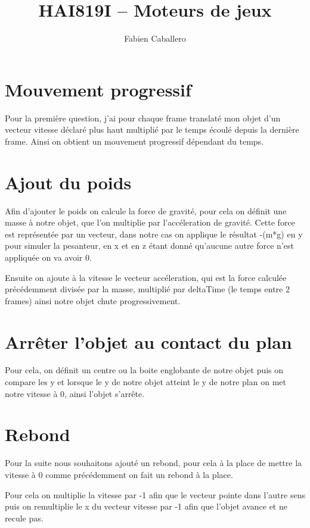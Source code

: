 \documentclass{article}
\title{HAI819I – Moteurs de jeux
}
\author{Fabien Caballero}
\begin{document}
\maketitle
    \tableofcontents

\newpage
\section{Mouvement progressif}

Pour la première question, j'ai pour chaque frame translaté mon objet d'un vecteur vitesse déclaré plus haut multiplié par le temps écoulé depuis la dernière frame.
Ainsi on obtient un mouvement progressif dépendant du temps.

\section{Ajout du poids}

Afin d'ajouter le poids on calcule la force de gravité, pour cela on définit une masse à notre objet, que l'on multiplie par l'accéleration de gravité.
Cette force est représentée par un vecteur, dans notre cas on applique le résultat -(m*g) en y pour simuler la pesanteur, en x et en z étant donné qu'aucune autre force n'est appliquée on va avoir 0.

Ensuite on ajoute à la vitesse le vecteur accéleration, qui est la force calculée précédemment divisée par la masse, multiplié par deltaTime (le temps entre 2 frames) ainsi notre objet chute progressivement.

\section{Arrêter l'objet au contact du plan}
Pour cela, on définit un centre ou la boite englobante de notre objet puis on compare les y et lorsque le y de notre objet atteint le y de notre plan on met notre vitesse à 0, ainsi l'objet s'arrête.

\section{Rebond}

Pour la suite nous souhaitons ajouté un rebond, pour cela à la place de mettre la vitesse à 0 comme précédemment on fait un rebond à la place.

Pour cela on multiplie la vitesse par -1 afin que le vecteur pointe dans l'autre sens puis on remultiplie le x du vecteur vitesse par -1 afin que l'objet avance et ne recule pas.
\end{document}
